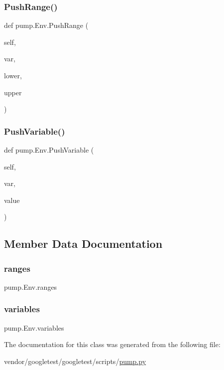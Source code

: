 \subsubsection{\texorpdfstring{Push\+Range()}{PushRange()}}
{\footnotesize\ttfamily def pump.\+Env.\+Push\+Range (\begin{DoxyParamCaption}\item[{}]{self,  }\item[{}]{var,  }\item[{}]{lower,  }\item[{}]{upper }\end{DoxyParamCaption})}

\mbox{\label{classpump_1_1_env_ae0abc25733c61a8cc010cc5d76dd0dd8}} 
\subsubsection{\texorpdfstring{Push\+Variable()}{PushVariable()}}
{\footnotesize\ttfamily def pump.\+Env.\+Push\+Variable (\begin{DoxyParamCaption}\item[{}]{self,  }\item[{}]{var,  }\item[{}]{value }\end{DoxyParamCaption})}



\subsection{Member Data Documentation}
\mbox{\label{classpump_1_1_env_a8d5fec087c1a9108de9b105922b34309}} 
\subsubsection{\texorpdfstring{ranges}{ranges}}
{\footnotesize\ttfamily pump.\+Env.\+ranges}

\mbox{\label{classpump_1_1_env_aba6456f3d0d23ac92bc9508c1b966bcd}} 
\subsubsection{\texorpdfstring{variables}{variables}}
{\footnotesize\ttfamily pump.\+Env.\+variables}



The documentation for this class was generated from the following file\+:\begin{DoxyCompactItemize}
\item 
vendor/googletest/googletest/scripts/\hyperlink{pump_8py}{pump.\+py}\end{DoxyCompactItemize}
